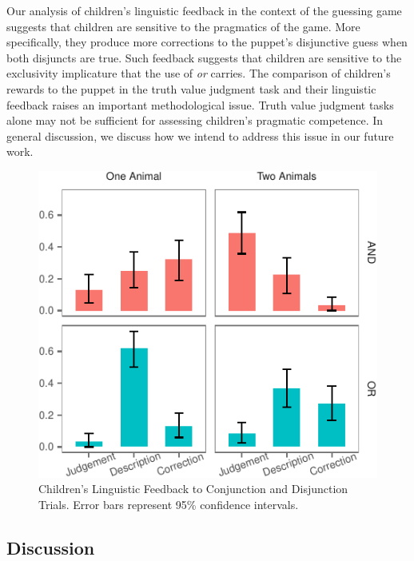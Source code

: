 \documentclass[10pt, letterpaper]{article}
\newenvironment{CodeChunk}{}{}
\begin{document}
Our analysis of children's linguistic feedback in the context of the
guessing game suggests that children are sensitive to the pragmatics of
the game. More specifically, they produce more corrections to the
puppet's disjunctive guess when both disjuncts are true. Such feedback
suggests that children are sensitive to the exclusivity implicature that
the use of \emph{or} carries. The comparison of children's rewards to
the puppet in the truth value judgment task and their linguistic
feedback raises an important methodological issue. Truth value judgment
tasks alone may not be sufficient for assessing children's pragmatic
competence. In general discussion, we discuss how we intend to address
this issue in our future work.

\begin{CodeChunk}
\begin{figure}[h]

{\centering \includegraphics{figs/feedback_data-1} 

}

\caption[Children's Linguistic Feedback to Conjunction and Disjunction Trials]{Children's Linguistic Feedback to Conjunction and Disjunction Trials. Error bars represent 95\% confidence intervals.}\label{fig:feedback_data}
\end{figure}
\end{CodeChunk}

\subsection{Discussion}\label{discussion-1}
\end{document}
